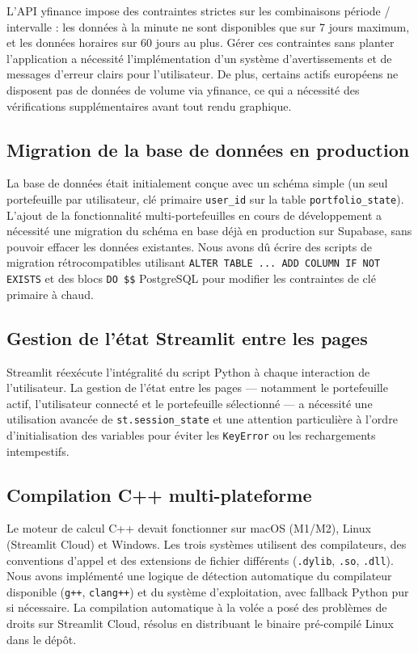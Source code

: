 \documentclass[a4paper, 12pt, twoside]{article}
\begin{document}
L'API yfinance impose des contraintes strictes sur les combinaisons
période / intervalle : les données à la minute ne sont disponibles que
sur 7 jours maximum, et les données horaires sur 60 jours au plus. Gérer
ces contraintes sans planter l'application a nécessité l'implémentation
d'un système d'avertissements et de messages d'erreur clairs pour
l'utilisateur. De plus, certains actifs européens ne disposent pas de
données de volume via yfinance, ce qui a nécessité des vérifications
supplémentaires avant tout rendu graphique.

\subsection{Migration de la base de données en production}

La base de données était initialement conçue avec un schéma simple (un
seul portefeuille par utilisateur, clé primaire \texttt{user\_id} sur la
table \texttt{portfolio\_state}). L'ajout de la fonctionnalité
multi-portefeuilles en cours de développement a nécessité une migration
du schéma en base déjà en production sur Supabase, sans pouvoir effacer
les données existantes. Nous avons dû écrire des scripts de migration
rétrocompatibles utilisant \texttt{ALTER TABLE ... ADD COLUMN IF NOT
EXISTS} et des blocs \texttt{DO \$\$} PostgreSQL pour modifier les
contraintes de clé primaire à chaud.

\subsection{Gestion de l'état Streamlit entre les pages}

Streamlit réexécute l'intégralité du script Python à chaque interaction
de l'utilisateur. La gestion de l'état entre les pages --- notamment le
portefeuille actif, l'utilisateur connecté et le portefeuille sélectionné
--- a nécessité une utilisation avancée de \texttt{st.session\_state} et
une attention particulière à l'ordre d'initialisation des variables pour
éviter les \texttt{KeyError} ou les rechargements intempestifs.

\subsection{Compilation C++ multi-plateforme}

Le moteur de calcul C++ devait fonctionner sur macOS (M1/M2), Linux
(Streamlit Cloud) et Windows. Les trois systèmes utilisent des
compilateurs, des conventions d'appel et des extensions de fichier
différents (\texttt{.dylib}, \texttt{.so}, \texttt{.dll}). Nous avons
implémenté une logique de détection automatique du compilateur disponible
(\texttt{g++}, \texttt{clang++}) et du système d'exploitation, avec
fallback Python pur si nécessaire. La compilation automatique à la volée
a posé des problèmes de droits sur Streamlit Cloud, résolus en
distribuant le binaire pré-compilé Linux dans le dépôt.
\end{document}
